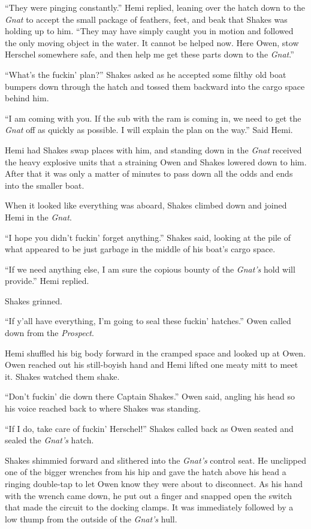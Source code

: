 \documentclass[]{scrbook}
\begin{document}
``They were pinging constantly.'' Hemi replied, leaning over the hatch
down to the \emph{Gnat} to accept the small package of feathers, feet,
and beak that Shakes was holding up to him. ``They may have simply
caught you in motion and followed the only moving object in the water.
It cannot be helped now. Here Owen, stow Herschel somewhere safe, and
then help me get these parts down to the \emph{Gnat}.''

``What's the fuckin' plan?'' Shakes asked as he accepted some filthy old
boat bumpers down through the hatch and tossed them backward into the
cargo space behind him.

``I am coming with you. If the sub with the ram is coming in, we need to
get the \emph{Gnat} off as quickly as possible. I will explain the plan
on the way.'' Said Hemi.

Hemi had Shakes swap places with him, and standing down in the
\emph{Gnat} received the heavy explosive units that a straining Owen and
Shakes lowered down to him. After that it was only a matter of minutes
to pass down all the odds and ends into the smaller boat.

When it looked like everything was aboard, Shakes climbed down and
joined Hemi in the \emph{Gnat}.

``I hope you didn't fuckin' forget anything.'' Shakes said, looking at
the pile of what appeared to be just garbage in the middle of his boat's
cargo space.

``If we need anything else, I am sure the copious bounty of the
\emph{Gnat's} hold will provide.'' Hemi replied.

Shakes grinned.

``If y'all have everything, I'm going to seal these fuckin' hatches.''
Owen called down from the \emph{Prospect}.

Hemi shuffled his big body forward in the cramped space and looked up at
Owen. Owen reached out his still-boyish hand and Hemi lifted one meaty
mitt to meet it. Shakes watched them shake.

``Don't fuckin' die down there Captain Shakes.'' Owen said, angling his
head so his voice reached back to where Shakes was standing.

``If I do, take care of fuckin' Herschel!'' Shakes called back as Owen
seated and sealed the \emph{Gnat's} hatch.

Shakes shimmied forward and slithered into the \emph{Gnat's} control
seat. He unclipped one of the bigger wrenches from his hip and gave the
hatch above his head a ringing double-tap to let Owen know they were
about to disconnect. As his hand with the wrench came down, he put out a
finger and snapped open the switch that made the circuit to the docking
clamps. It was immediately followed by a low thump from the outside of
the \emph{Gnat's} hull.
\end{document}
